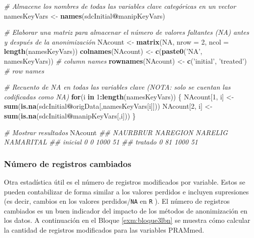\documentclass[]{book}
\newenvironment{Shaded}{\begin{snugshade}}{\end{snugshade}}
\newcommand{\CommentTok}[1]{\textcolor[rgb]{0.56,0.35,0.01}{\textit{#1}}}
\newcommand{\ControlFlowTok}[1]{\textcolor[rgb]{0.13,0.29,0.53}{\textbf{#1}}}
\newcommand{\DataTypeTok}[1]{\textcolor[rgb]{0.13,0.29,0.53}{#1}}
\newcommand{\DecValTok}[1]{\textcolor[rgb]{0.00,0.00,0.81}{#1}}
\newcommand{\KeywordTok}[1]{\textcolor[rgb]{0.13,0.29,0.53}{\textbf{#1}}}
\newcommand{\NormalTok}[1]{#1}
\newcommand{\OperatorTok}[1]{\textcolor[rgb]{0.81,0.36,0.00}{\textbf{#1}}}
\newcommand{\OtherTok}[1]{\textcolor[rgb]{0.56,0.35,0.01}{#1}}
\newcommand{\StringTok}[1]{\textcolor[rgb]{0.31,0.60,0.02}{#1}}
\theoremstyle{definition}
\theoremstyle{definition}
\theoremstyle{definition}
\theoremstyle{definition}
\theoremstyle{remark}
\begin{document}
\begin{Shaded}
\begin{Highlighting}[]
\CommentTok{# Almacene los nombres de todas las variables clave categóricas en un vector}
\NormalTok{namesKeyVars <-}\StringTok{ }\KeywordTok{names}\NormalTok{(sdcInitial}\OperatorTok{@}\NormalTok{manipKeyVars)}

\CommentTok{# Elaborar una matriz para almacenar el número de valores faltantes (NA) antes y después de la anonimización}
\NormalTok{NAcount <-}\StringTok{ }\KeywordTok{matrix}\NormalTok{(}\OtherTok{NA}\NormalTok{, }\DataTypeTok{nrow =} \DecValTok{2}\NormalTok{, }\DataTypeTok{ncol =} \KeywordTok{length}\NormalTok{(namesKeyVars))}
\KeywordTok{colnames}\NormalTok{(NAcount) <-}\StringTok{ }\KeywordTok{c}\NormalTok{(}\KeywordTok{paste0}\NormalTok{(}\StringTok{'NA'}\NormalTok{, namesKeyVars)) }\CommentTok{# column names}
\KeywordTok{rownames}\NormalTok{(NAcount) <-}\StringTok{ }\KeywordTok{c}\NormalTok{(}\StringTok{'initial'}\NormalTok{, }\StringTok{'treated'}\NormalTok{) }\CommentTok{# row names}

\CommentTok{# Recuento de NA en todas las variables clave (NOTA: solo se cuentan las codificadas como NA)}
\ControlFlowTok{for}\NormalTok{(i }\ControlFlowTok{in} \DecValTok{1}\OperatorTok{:}\KeywordTok{length}\NormalTok{(namesKeyVars)) \{}
\NormalTok{  NAcount[}\DecValTok{1}\NormalTok{, i] <-}\StringTok{ }\KeywordTok{sum}\NormalTok{(}\KeywordTok{is.na}\NormalTok{(sdcInitial}\OperatorTok{@}\NormalTok{origData[,namesKeyVars[i]]))}
\NormalTok{  NAcount[}\DecValTok{2}\NormalTok{, i] <-}\StringTok{ }\KeywordTok{sum}\NormalTok{(}\KeywordTok{is.na}\NormalTok{(sdcInitial}\OperatorTok{@}\NormalTok{manipKeyVars[,i]))}
\NormalTok{\}}

\CommentTok{# Mostrar resultados}
\NormalTok{NAcount}
\CommentTok{## NAURBRUR NAREGION NARELIG NAMARITAL}
\CommentTok{## inicial 0 0 1000 51}
\CommentTok{## tratado 0 81 1000 51}
\end{Highlighting}
\end{Shaded}

\hypertarget{nuxfamero-de-registros-cambiados}{%
\subsubsection{Número de registros cambiados}\label{nuxfamero-de-registros-cambiados}}

Otra estadística útil es el número de registros modificados por variable. Estos se pueden contabilizar de forma similar a los valores perdidos e incluyen supresiones (es decir, cambios en los valores perdidos/\texttt{NA} en \texttt{R} ). El número de registros cambiados es un buen indicador del impacto de los métodos de anonimización en los datos. A
continuación en el Bloque \ref{exm:bloque3lbn} se muestra cómo calcular la cantidad de registros modificados para las variables PRAMmed.
\end{document}
